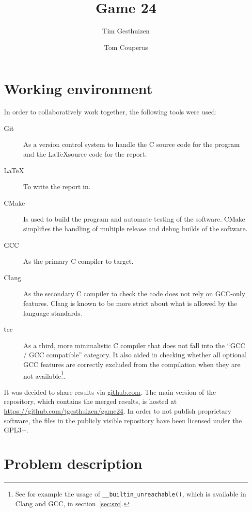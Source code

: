 \documentclass[11pt,a4paper]{article}
\author{Tim Gesthuizen \and Tom Couperus}
\title{Game 24}
\newcommand{\code}[1]{\texttt{#1}}
\begin{document}
\maketitle

\tableofcontents

\listoffigures

\clearpage

\section{Working environment}

In order to collaboratively work together, the following tools were
used:

\begin{description}
\item[Git] As a version control system to handle the C source code for
  the program and the \LaTeX source code for the report.
\item[\LaTeX] To write the report in.
\item[CMake] Is used to build the program and automate testing of the
  software. CMake simplifies the handling of multiple release and
  debug builds of the software.
\item[GCC] As the primary C compiler to target.
\item[Clang] As the secondary C compiler to check the code does not rely
  on GCC-only features. Clang is known to be more strict about what is
  allowed by the language standards.
\item[tcc] As a third, more minimalistic C compiler that does not fall
  into the ``GCC / GCC compatible'' category. It also aided in
  checking whether all optional GCC features are correctly excluded
  from the compilation when they are not available\footnote{See for
    example the usage of \code{\_\_builtin\_unreachable()}, which is
    available in Clang and GCC, in section~\ref{sec:src}.}.
\end{description}

It was decided to share results via \url{github.com}. The main version
of the repository, which contains the merged results, is hosted at
\url{https://github.com/tgesthuizen/game24}.
In order to not publish proprietary software, the files in the
publicly visible repository have been licensed under the GPL3+.

\section{Problem description}
\end{document}
